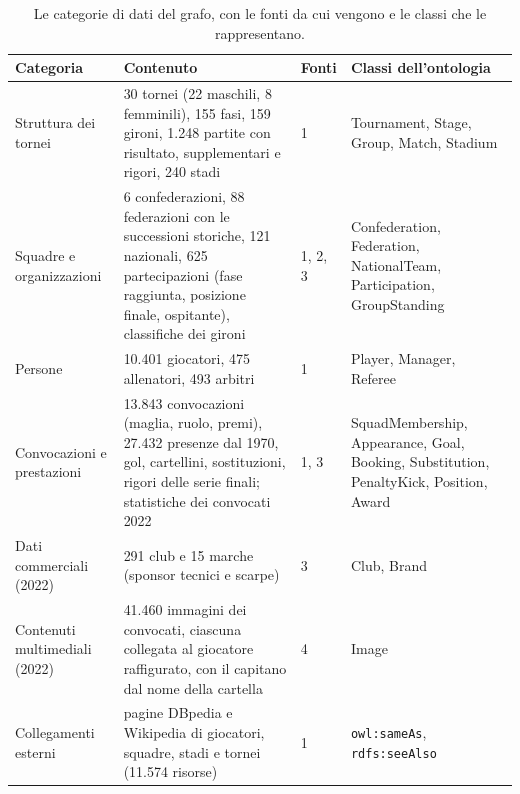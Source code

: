 \documentclass[11pt,a4paper]{article}
\newcommand{\code}[1]{\texttt{\small #1}}
\begin{document}
\begin{table}[!htb]
\centering\small
\begin{tabularx}{\textwidth}{@{}>{\raggedright\arraybackslash}p{2.6cm} Y l >{\raggedright\arraybackslash}p{3.4cm}@{}}
\toprule
\textbf{Categoria} & \textbf{Contenuto} & \textbf{Fonti} & \textbf{Classi dell'ontologia} \\
\midrule
Struttura dei tornei & 30 tornei (22 maschili, 8 femminili), 155 fasi, 159 gironi, 1.248 partite con risultato, supplementari e rigori, 240 stadi & 1 & Tournament, Stage, Group, Match, Stadium \\
Squadre e organizzazioni & 6 confederazioni, 88 federazioni con le successioni storiche, 121 nazionali, 625 partecipazioni (fase raggiunta, posizione finale, ospitante), classifiche dei gironi & 1, 2, 3 & Confederation, Federation, NationalTeam, Participation, GroupStanding \\
Persone & 10.401 giocatori, 475 allenatori, 493 arbitri & 1 & Player, Manager, Referee \\
Convocazioni e prestazioni & 13.843 convocazioni (maglia, ruolo, premi), 27.432 presenze dal 1970, gol, cartellini, sostituzioni, rigori delle serie finali; statistiche dei convocati 2022 & 1, 3 & SquadMembership, Appearance, Goal, Booking, Substitution, PenaltyKick, Position, Award \\
Dati commerciali (2022) & 291 club e 15 marche (sponsor tecnici e scarpe) & 3 & Club, Brand \\
Contenuti multimediali (2022) & 41.460 immagini dei convocati, ciascuna collegata al giocatore raffigurato, con il capitano dal nome della cartella & 4 & Image \\
Collegamenti esterni & pagine DBpedia e Wikipedia di giocatori, squadre, stadi e tornei (11.574 risorse) & 1 & \code{owl:sameAs}, \code{rdfs:seeAlso} \\
\bottomrule
\end{tabularx}
\caption{Le categorie di dati del grafo, con le fonti da cui vengono e le classi che le rappresentano.}
\label{tab:categorie}
\end{table}
\end{document}
